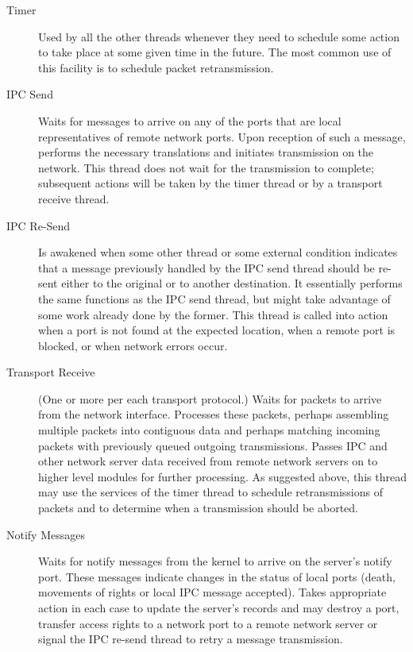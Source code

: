 \begin{description}
\item[Timer] Used by all the other threads whenever they need to schedule
some action to take place at some given time in the future.  The most
common use of this facility is to schedule packet retransmission.

\item[IPC Send] Waits for messages to arrive on any of the ports that are
local representatives of remote network ports.  Upon reception of such a
message, performs the necessary translations and initiates transmission on
the network.  This thread does not wait for the transmission to complete;
subsequent actions will be taken by the timer thread or by a transport
receive thread.

\item[IPC Re-Send] Is awakened when some other thread or some external
condition indicates that a message previously handled by the IPC send thread
should be re-sent either to the original or to another destination.  It
essentially performs the same functions as the IPC send thread, but might
take advantage of some work already done by the former.  This thread is
called into action when a port is not found at the expected location, when a
remote port is blocked, or when network errors occur.

\item[Transport Receive] (One or more per each transport protocol.)  Waits for
packets to arrive from the network interface.  Processes these packets,
perhaps assembling multiple packets into contiguous data and perhaps matching
incoming packets with previously queued outgoing transmissions.  Passes
IPC and other network server data received from remote network servers on to
higher level modules for further processing.  As suggested above, this
thread may use the services of the timer thread to schedule retransmissions
of packets and to determine when a transmission should be aborted.

\item[Notify Messages] Waits for notify messages from the kernel to arrive
on the server's notify port.  These messages indicate changes in the status
of local ports (death, movements of rights or local IPC message accepted).
Takes appropriate action in each case to update the server's records and may
destroy a port, transfer access rights to a network port to a remote network
server or signal the IPC re-send thread to retry a message transmission.


\end{description}
